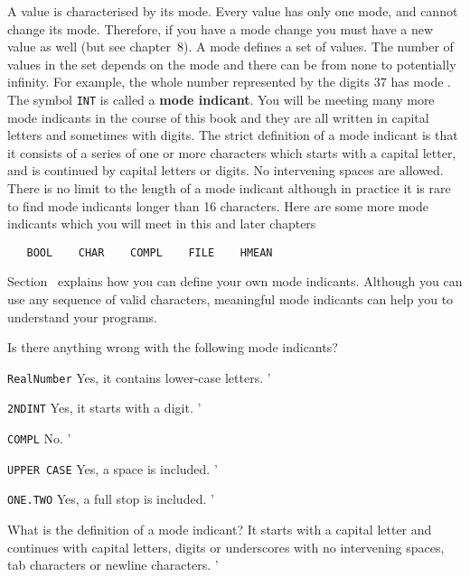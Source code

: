 A value is characterised by its mode.  Every value has only one mode,
and cannot change its mode.  Therefore, if you have a mode change you
must have a new value as well (but see chapter~8).  A mode defines a
set of values. The number of values in the set depends on the mode
and there can be from none to potentially infinity.  For example, the
whole number represented by the digits 37 has mode .  The
symbol \verb|INT| is called a \textbf{mode indicant}.  You will be
meeting many more mode indicants in the course of this book and they
are all written in capital letters and sometimes with digits.  The
strict definition of a mode indicant is that it consists of a series
of one or more characters which starts with a capital letter, and is
continued by capital letters or digits.  No intervening spaces are
allowed.  There is no limit to the length of a mode indicant although
in practice it is rare to find mode indicants longer than 16
characters.  Here are some more mode indicants which you will meet in
this and later chapters
\begin{verbatim}
   BOOL    CHAR    COMPL    FILE    HMEAN
\end{verbatim}
\noindent
Section~ explains how you can define your own mode
indicants. Although you can use any sequence of valid characters,
meaningful mode indicants can help you to understand your programs.
\begin{exercise}
\item Is there anything wrong with the following mode indicants?
\begin{subex}
\item \verb|RealNumber| \subans Yes, it contains lower-case letters.
'
\item \verb|2NDINT| \subans Yes, it starts with a digit.
'
\item \verb|COMPL| \subans No.
'
\item \verb|UPPER CASE| \subans Yes, a space is included.
'
\item \verb|ONE.TWO| \subans Yes, a full stop is included.
'
\end{subex}
\item What is the definition of a mode indicant?  \ans It starts with
a capital letter and continues with capital letters, digits or
underscores with no intervening spaces, tab characters or newline
characters.
'
\end{exercise}

